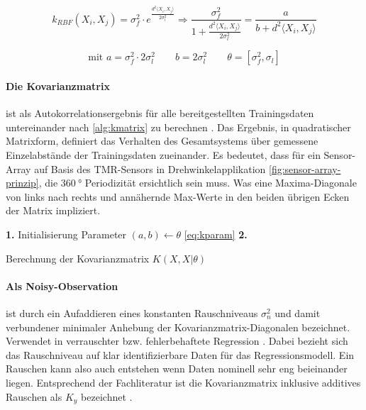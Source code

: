 \begin{equation}\label{eq:rbf}
	k_{RBF}(X_i, X_j) = \sigma_f^2 \cdot e^{\frac{d^2\langle X_i, X_j \rangle}{2 \sigma_l^2}} \Rightarrow \frac{\sigma_f^2}{1 + \frac{d^2\langle X_i, X_j \rangle}{2 \sigma_l^2}} = \frac{a}{b + d^2\langle X_i, X_j \rangle}
\end{equation}

\begin{equation}\label{eq:kparam}
	\text{mit } a = \sigma_f^2 \cdot 2 \sigma_l^2 \qquad b = 2 \sigma_l^2 \qquad \theta = \left[\sigma_f^2, \sigma_l\right]
\end{equation}


\paragraph*{Die Kovarianzmatrix} ist als Autokorrelationsergebnis für alle bereitgestellten Trainingsdaten untereinander nach \autoref{alg:kmatrix} zu berechnen \cite{Rasmussen2006}. Das Ergebnis, in quadratischer Matrixform, definiert das Verhalten des Gesamtsystems über gemessene Einzelabstände der Trainingsdaten zueinander. Es bedeutet, dass für ein Sensor-Array auf Basis des TMR-Sensors \cite{TDK2016} in Drehwinkelapplikation \autoref{fig:sensor-array-prinzip}, die $\SI{360}{\degree}$ Periodizität ersichtlich sein muss. Was eine Maxima-Diagonale von links nach rechts und annähernde Max-Werte in den beiden übrigen Ecken der Matrix impliziert.


\begin{algorithm}[h]
	\SetAlgoLined
	\textbf{1.} Initialisierung Parameter $(a,b) \leftarrow \theta$ \autoref{eq:kparam}\;
	\textbf{2.} 
	\caption{Berechnung der Kovarianzmatrix $K(X, X|\theta)$}
	\label{alg:kmatrix}
\end{algorithm}


\clearpage


\paragraph*{Als Noisy-Observation} ist durch ein Aufaddieren eines konstanten Rauschniveaus $\sigma_n^2$ und damit verbundener minimaler Anhebung der Kovarianzmatrix-Diagonalen bezeichnet. Verwendet in verrauschter bzw. fehlerbehaftete Regression \cite{Rasmussen2006}. Dabei bezieht sich das Rauschniveau auf klar identifizierbare Daten für das Regressionsmodell. Ein Rauschen kann also auch entstehen wenn Daten nominell sehr eng beieinander liegen. Entsprechend der Fachliteratur ist die Kovarianzmatrix inklusive additives Rauschen als $K_y$ bezeichnet \cite{Rasmussen2006}.


